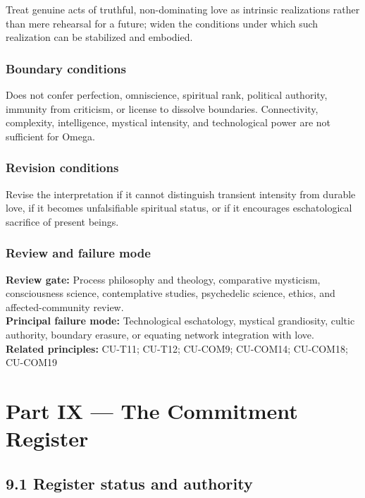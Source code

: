 \documentclass[
  11pt,
]{article}
\begin{document}
Treat genuine acts of truthful, non-dominating love as intrinsic
realizations rather than mere rehearsal for a future; widen the
conditions under which such realization can be stabilized and embodied.

\subsubsection{Boundary conditions}\label{boundary-conditions-4}

Does not confer perfection, omniscience, spiritual rank, political
authority, immunity from criticism, or license to dissolve boundaries.
Connectivity, complexity, intelligence, mystical intensity, and
technological power are not sufficient for Omega.

\subsubsection{Revision conditions}\label{revision-conditions-4}

Revise the interpretation if it cannot distinguish transient intensity
from durable love, if it becomes unfalsifiable spiritual status, or if
it encourages eschatological sacrifice of present beings.

\subsubsection{Review and failure mode}\label{review-and-failure-mode-4}

\textbf{Review gate:} Process philosophy and theology, comparative
mysticism, consciousness science, contemplative studies, psychedelic
science, ethics, and affected-community review.\\
\textbf{Principal failure mode:} Technological eschatology, mystical
grandiosity, cultic authority, boundary erasure, or equating network
integration with love.\\
\textbf{Related principles:} CU-T11; CU-T12; CU-COM9; CU-COM14;
CU-COM18; CU-COM19

\section{Part IX --- The Commitment
Register}\label{part-ix-the-commitment-register}

\subsection{9.1 Register status and
authority}\label{register-status-and-authority}
\end{document}
